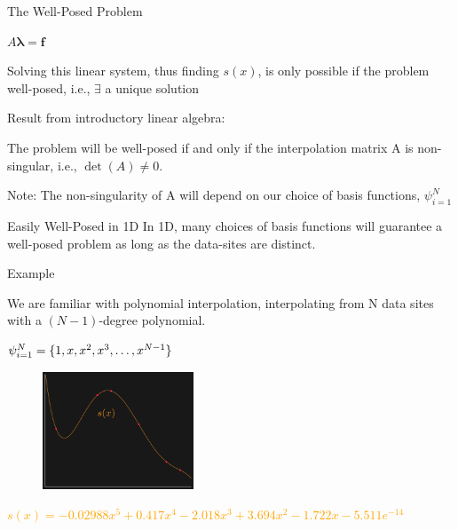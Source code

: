 \documentclass[12pt,t]{beamer}
\newcommand{\subt}[1]{{\footnotesize \color{subtitle} {#1}}}
\begin{document}
\begin{frame}{The Well-Posed Problem}
\begin{center}
$A\boldsymbol{\lambda}=\boldsymbol{f}$
\end{center}

Solving this linear system, thus finding $s(x)$, is only possible if the problem \subt{well-posed}, i.e., $\exists$ a unique solution 
\bigskip
\pause

\subt{Result from introductory linear algebra:} 

The problem will be well-posed if and only if the interpolation matrix A is \subt{non-singular}, i.e., $\det(A)\neq0$.
\bigskip
\pause

\subt{Note:} The non-singularity of A will depend on our choice of basis functions, $\psi_{i=1}^N$

\end{frame}

\begin{frame}{Easily Well-Posed in 1D}
In 1D, many choices of basis functions will guarantee a well-posed problem as long as the data-sites are distinct. 
\bigskip
\pause

\subt{Example}

We are familiar with \subt{polynomial interpolation}, interpolating from N data sites with a $(N-1)$-degree polynomial. 
\begin{center}
$\psi_{i=1}^N=\{1,x,x^2,x^3, \mathellipsis, x^{N-1}\}$
\end{center}
\pause
\begin{figure}
\includegraphics[width=0.4\textwidth, keepaspectratio]{polyinterp.png}
\end{figure}
\footnotesize{\textcolor{orange}{$s(x)=-0.02988 x^5 + 0.417 x^4 - 2.018 x^3 + 3.694 x^2 - 1.722 x - 5.511e^{-14}$}}
\note{}
\end{frame}
\end{document}
